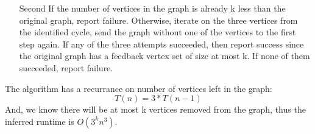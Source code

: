 \documentclass[12pt]{article}
\begin{document}
\begin{enumerate}
\begin{itemize}
\begin{itemize}
\item[Second]
If the number of vertices in the graph is already k less than the original graph, report failure. Otherwise, iterate on the three vertices from the identified cycle, send the graph without one of the vertices to the first step again. If any of the three attempts succeeded, then report success since the original graph has a feedback vertex set of size at most k. If none of them succeeded, report failure.
\end{itemize}

The algorithm has a recurrance on number of vertices left in the graph:
\begin{equation}
T(n) = 3 * T(n-1)
\end{equation}
And, we know there will be at most k vertices removed from the graph, thus the inferred runtime is $O(3^{k}n^{3})$.



\end{itemize}

\end{enumerate}
\end{document}
